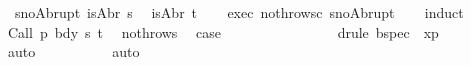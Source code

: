 \begin{isabellebody}
\ \ s{\isacharunderscore}no{\isacharunderscore}Abrupt{\isacharcolon}\ {\isachardoublequoteopen}{\isasymnot}{\isacharparenleft}isAbr\ s{\isacharparenright}{\isachardoublequoteclose}\isanewline
\ \ {\isachardoublequoteopen}{\isasymnot}{\isacharparenleft}isAbr\ t{\isacharparenright}{\isachardoublequoteclose}\isanewline
%
\isadelimproof
\ \ %
\endisadelimproof
%
\isatagproof
{}\isamarkupfalse%
\ exec\ nothrows{\isacharunderscore}c\ s{\isacharunderscore}no{\isacharunderscore}Abrupt\isanewline
\ \ \isamarkupfalse%
\ {\isacharparenleft}induct{\isacharparenright}\ \isanewline
\ \ \ \ \isamarkupfalse%
\ {\isacharparenleft}Call\ p\ bdy\ s\ t{\isacharparenright}\ \isamarkupfalse%
\ nothrows{\isacharunderscore}{\isasymGamma}\ \isamarkupfalse%
\ {\isacharquery}case\isanewline
\ \ \ \ \ \ \isamarkupfalse%
\ {\isacharminus}\isanewline
\ \ \ \ \ \ \isamarkupfalse%
\ {\isacharparenleft}drule\ bspec\ {\isacharbrackleft}\ x{\isacharequal}p{\isacharbrackright}{\isacharparenright}\isanewline
\ \ \ \ \ \ \isamarkupfalse%
\ auto\isanewline
\ \ \ \ \ \ \isamarkupfalse%
\isanewline
\ \ \isamarkupfalse%
\ {\isacharparenleft}auto{\isacharparenright}%
\endisatagproof
{\isafoldproof}%
%
\isadelimproof
\isanewline
%
\endisadelimproof
%
\isadelimtheory
\isanewline
%
\endisadelimtheory
%
\isatagtheory
{}\isamarkupfalse%
%
\endisatagtheory
{\isafoldtheory}%
%
\isadelimtheory
%
\endisadelimtheory
%
\end{isabellebody}%
